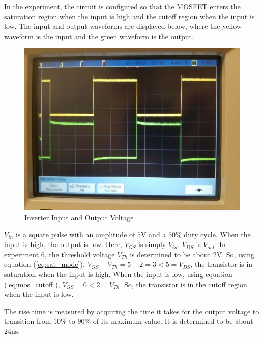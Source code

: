 In the experiment, the circuit is configured so that the MOSFET enters the saturation region when the input is high and the cutoff region when the input is low. The input and output waveforms are displayed below, where the yellow waveform is the input and the green waveform is the output.

\FloatBarrier
\begin{figure}[h!]
	\centering
	\includegraphics[scale=0.25]{../images/inverter_in_out.jpeg}
	\caption{Inverter Input and Output Voltage}
	\label{fig:inverter_in_out}
\end{figure}
\FloatBarrier

$V_{in}$ is a square pulse with an amplitude of $5$\si{\volt} and a $50\%$ duty cycle. When the input is high, the output is low. Here, $V_{GS}$ is simply $V_{in}$. $V_{DS}$ is $V_{out}$. In experiment 6, the threshold voltage $V_{Th}$ is determined to be about $2$\si{\volt}. So, using equation (\ref{eq:sat_mode}), $V_{GS} - V_{Th} = 5 - 2 = 3 < 5 = V_{DS}$, the transistor is in saturation when the input is high. When the input is low, using equation (\ref{eq:mos_cutoff}), $V_{GS} = 0 < 2 = V_{Th}$. So, the transistor is in the cutoff region when the input is low.

The rise time is measured by acquiring the time it takes for the output voltage to transition from $10\%$ to $90\%$ of its maximum value. It is determined to be about $24$\si{\nano\second}.

